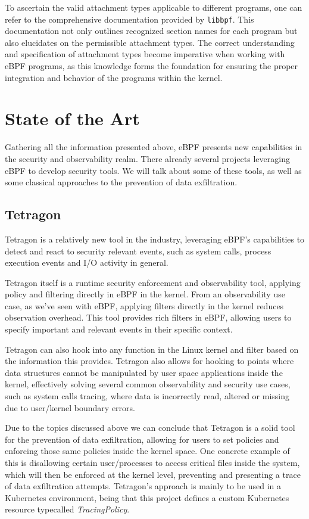 To ascertain the valid attachment types applicable to different programs, one can refer to the comprehensive documentation provided by \texttt{libbpf}. This documentation not only outlines recognized section names for each program but also elucidates on the permissible attachment types. The correct understanding and specification of attachment types become imperative when working with eBPF programs, as this knowledge forms the foundation for ensuring the proper integration and behavior of the programs within the kernel.


\section{State of the Art}

Gathering all the information presented above, eBPF presents new capabilities in  the security and observability realm. There already several projects leveraging eBPF to develop security tools.
We will talk about some of these tools, as well as some classical approaches to the prevention of data exfiltration. 

\subsection{Tetragon}

Tetragon \cite{tetragon} is a relatively new tool in the industry, leveraging eBPF's capabilities to detect and react to security relevant events, such as system calls, process execution events and I/O activity in general. 

Tetragon itself is a runtime security enforcement and observability tool, applying policy and filtering directly in eBPF in the kernel. From an observability use case, as we've seen with eBPF, applying filters directly in the kernel reduces observation overhead. This tool provides rich filters in eBPF, allowing users to specify important and relevant events in their specific context. 

Tetragon can also hook into any function in the Linux kernel and filter based on the information this provides. Tetragon also allows for hooking to points where data structures cannot be manipulated by user space applications inside the kernel, effectively solving several common observability and security use cases, such as system calls tracing, where data is incorrectly read, altered or missing due to user/kernel boundary errors. 

Due to the topics discussed above we can conclude that Tetragon is a solid tool for the prevention of data exfiltration, allowing for users to set policies and enforcing those same policies inside the kernel space. One concrete example of this is disallowing certain user/processes to access critical files inside the system, which will then be enforced at the kernel level, preventing and presenting a trace of data exfiltration attempts. Tetragon's approach is mainly to be used in a Kubernetes environment, being that this project defines a custom Kubernetes resource typecalled \textit{TracingPolicy}. 

